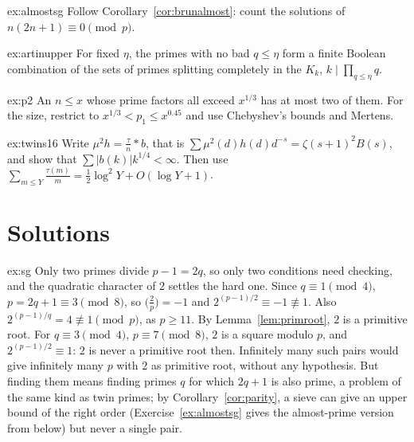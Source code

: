 \begin{hint}{ex:almostsg}
Follow Corollary~\ref{cor:brunalmost}: count the solutions of $n(2n+1)\equiv0\pmod p$.
\end{hint}

\begin{hint}{ex:artinupper}
For fixed $\eta$, the primes with no bad $q\le\eta$ form a finite Boolean combination of the sets of primes splitting completely in the $K_k$, $k\mid\prod_{q\le\eta}q$.
\end{hint}

\begin{hint}{ex:p2}
An $n\le x$ whose prime factors all exceed $x^{1/3}$ has at most two of them. For the size, restrict to $x^{1/3}<p_1\le x^{0.45}$ and use Chebyshev's bounds and Mertens.
\end{hint}

\begin{hint}{ex:twins16}
Write $\mu^2h=\frac\tau n*b$, that is $\sum\mu^2(d)h(d)d^{-s}=\zeta(s+1)^2B(s)$, and show that $\sum|b(k)|k^{1/4}<\infty$. Then use $\sum_{m\le Y}\frac{\tau(m)}m=\frac12\log^2Y+O(\log Y+1)$.
\end{hint}

\section{Solutions}

\begin{solution}{ex:sg}
\idea Only two primes divide $p-1=2q$, so only two conditions need checking, and the quadratic character of $2$ settles the hard one.
\writeup Since $q\equiv1\pmod4$, $p=2q+1\equiv3\pmod8$, so $\bigl(\frac2p\bigr)=-1$ and $2^{(p-1)/2}\equiv-1\not\equiv1$. Also $2^{(p-1)/q}=4\not\equiv1\pmod p$, as $p\ge11$. By Lemma~\ref{lem:primroot}, $2$ is a primitive root. For $q\equiv3\pmod4$, $p\equiv7\pmod8$, $2$ is a square modulo $p$, and $2^{(p-1)/2}\equiv1$: $2$ is never a primitive root then.
Infinitely many such pairs would give infinitely many $p$ with $2$ as primitive root, without any hypothesis. But finding them means finding primes $q$ for which $2q+1$ is also prime, a problem of the same kind as twin primes; by Corollary~\ref{cor:parity}, a sieve can give an upper bound of the right order (Exercise~\ref{ex:almostsg} gives the almost-prime version from below) but never a single pair.
\end{solution}

